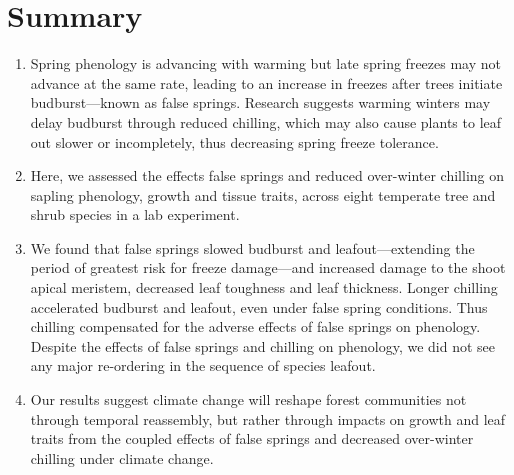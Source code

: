 \documentclass{article}\usepackage[]{graphicx}\usepackage[]{color}
\begin{document}
\section*{Summary} %
\begin{enumerate}
\item Spring phenology is advancing with warming but late spring freezes may not advance at the same rate, leading to an increase in freezes after trees initiate budburst---known as false springs. Research suggests warming winters may delay budburst through reduced chilling, which may also cause plants to leaf out slower or incompletely, thus decreasing spring freeze tolerance. 
\item Here, we assessed the effects false springs and reduced over-winter chilling on sapling phenology, growth and tissue traits, across eight temperate tree and shrub species in a lab experiment. 
\item We found that false springs slowed budburst and leafout---extending the period of greatest risk for freeze damage---and increased damage to the shoot apical meristem, decreased leaf toughness and leaf thickness. Longer chilling accelerated budburst and leafout, even under false spring conditions. Thus chilling compensated for the adverse effects of false springs on phenology. Despite the effects of false springs and chilling on phenology, we did not see any major re-ordering in the sequence of species leafout.
\item Our results suggest climate change will reshape forest communities not through temporal reassembly, but rather through impacts on growth and leaf traits from the coupled effects of false springs and decreased over-winter chilling under climate change.



\end{enumerate}
\end{document}
